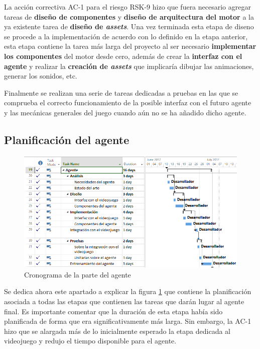 \bigskip

La acción correctiva AC-1 para el riesgo RSK-9 hizo que fuera necesario agregar tareas de \textbf{diseño de componentes} y \textbf{diseño de arquitectura del motor} a la ya existente tarea de \textbf{diseño de \textit{assets}}. Una vez terminada esta etapa de diseno se procede a la implementación de acuerdo con lo definido en la etapa anterior, esta etapa contiene la tarea más larga del proyecto al ser necesario \textbf{implementar los componentes} del motor desde cero, además de crear la \textbf{interfaz con el agente} y realizar la \textbf{creación de \textit{assets}} que implicaría dibujar las animaciones, generar los sonidos, etc.

\bigskip

Finalmente se realizan una serie de tareas dedicadas a pruebas en las que se comprueba el correcto funcionamiento de la posible interfaz con el futuro agente y las mecánicas generales del juego cuando aún no se ha añadido dicho agente.


\subsection{Planificación del agente}

\begin{figure}
	\centerline{\includegraphics[width=19cm]{otros/capturasPlanificacion/agente.PNG}}
	\caption{Cronograma de la parte del agente}
	\label{plan:agente}
\end{figure}

Se dedica ahora este apartado a explicar la figura \ref{plan:agente} que contiene la planificación asociada a todas las etapas que contienen las tareas que darán lugar al agente final. Es importante comentar que la duración de esta etapa había sido planificada de forma que era significativamente más larga. Sin embargo, la AC-1 hizo que se alargada más de lo inicialmente esperado la etapa dedicada al videojuego y redujo el tiempo disponible para el agente.


